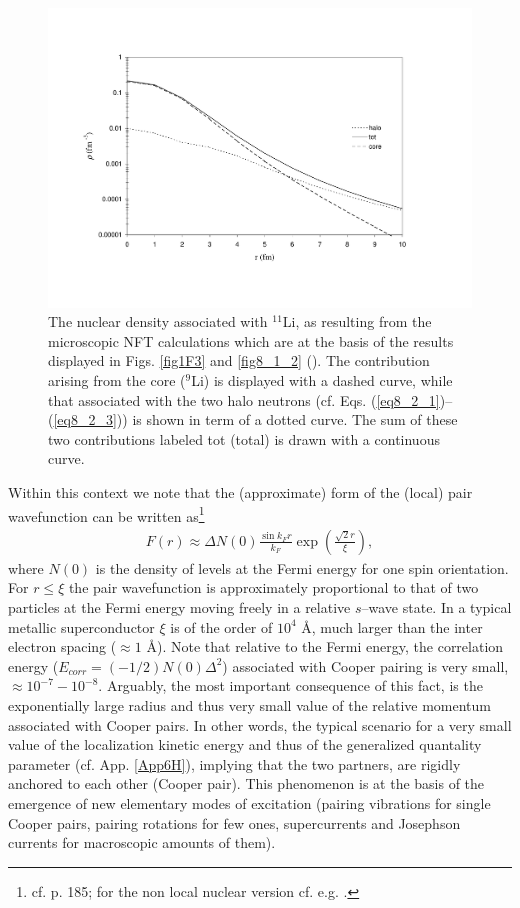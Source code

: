 \begin{figure}
\centerline{\includegraphics*[width=15cm,angle=0]{nutshell/figs/fig3_2_2.pdf}}
\caption{The nuclear density associated with $^{11}$Li, as resulting from the microscopic NFT calculations which are at the basis of the results displayed in Figs. \ref{fig1F3} and \ref{fig8_1_2} (\cite{Barranco:01}). The contribution arising from the core ($^{9}$Li) is displayed with a dashed curve, while that associated with the two halo neutrons (cf. Eqs. (\ref{eq8_2_1})--(\ref{eq8_2_3})) is shown in term of a dotted curve. The sum of these two contributions  labeled tot (total) is drawn with a continuous curve.}\label{fig3.2.2}
\end{figure}
Within this context we note that the (approximate) form of the (local) pair wavefunction can be written as\footnote{cf. \cite{Leggett:06} p. 185; for the non local nuclear version cf. e.g. \cite{Broglia:83c}.}
\begin{align}
F(r)\approx\Delta N(0)\frac{\sin k_F r}{k_F}\exp\left(\frac{\sqrt{2}r}{\xi}\right),
\end{align}
where $N(0)$ is the density of levels at the Fermi energy for one spin orientation. For $r\leq\xi$ the pair wavefunction is approximately proportional to that of two particles at the Fermi energy moving freely in a relative $s$--wave state. In a typical metallic superconductor $\xi$ is of the order of $10^4$ \AA, much larger than the inter electron spacing ($\approx 1$ \AA). Note that relative to the Fermi energy, the correlation energy ($E_{corr}=(-1/2)N(0)\Delta^2$) associated with Cooper pairing is very small, $\approx 10^{-7}-10^{-8}$. Arguably, the most important consequence of this fact, is the exponentially large radius and thus very small value of the relative momentum associated with Cooper pairs. In other words, the typical scenario for a very small value of the localization kinetic energy and thus of the generalized quantality parameter (cf. App. \ref{App6H}), implying that the two partners, are rigidly anchored to each other (Cooper pair). This phenomenon is at the basis  of the emergence of new elementary modes of excitation (pairing vibrations for single Cooper pairs, pairing rotations for few ones, supercurrents and Josephson currents for macroscopic amounts of them).



